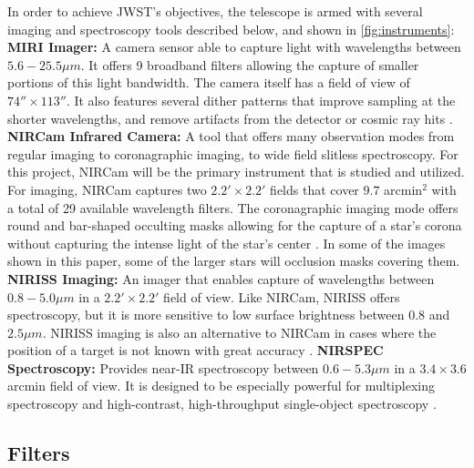 \documentclass[10pt,twocolumn,letterpaper]{article}
\begin{document}
In order to achieve JWST's objectives, the telescope is armed with several imaging and spectroscopy tools described below, and shown in \cref{fig:instruments}:
\newline
\textbf{MIRI Imager:} A camera sensor able to capture light with wavelengths between $5.6 - 25.5\mu m$. It offers 9 broadband filters allowing the capture of smaller portions of this light bandwidth. 
The camera itself has a field of view of $74'' \times 113''$. It also features several dither patterns that improve sampling at the shorter wavelengths, and remove artifacts from the detector or cosmic ray hits \cite{webbmiri}.
\newline
\textbf{NIRCam Infrared Camera:} A tool that offers many observation modes from regular imaging to coronagraphic imaging, to wide field slitless spectroscopy. For this project, NIRCam will be the primary instrument that is studied and utilized.
For imaging, NIRCam captures two $2.2' \times 2.2'$ fields that cover $9.7$ arcmin$^2$ with a total of 29 available wavelength filters.
The coronagraphic imaging mode offers round and bar-shaped occulting masks allowing for the capture of a star's corona without capturing the intense light of the star's center \cite{webbnircam}. In some of the images shown in this paper, some of the larger stars will occlusion masks covering them.
\newline
\textbf{NIRISS Imaging:} An imager that enables capture of wavelengths between $0.8 - 5.0\mu m$ in a $2.2' \times 2.2'$ field of view. 
Like NIRCam, NIRISS offers spectroscopy, but it is more sensitive to low surface brightness between $0.8$ and $2.5\mu m$. 
NIRISS imaging is also an alternative to NIRCam in cases where the position of a target is not known with great accuracy \cite{webbniriss}.
\newline
\textbf{NIRSPEC Spectroscopy:} Provides near-IR spectroscopy between $0.6 - 5.3 \mu m$ in a $3.4 \times 3.6$ arcmin field of view. It is designed to be especially powerful for multiplexing spectroscopy and high-contrast, high-throughput single-object spectroscopy \cite{webbnirspec}.

\subsection{Filters}
\end{document}

